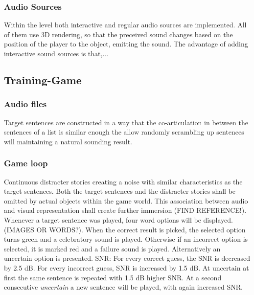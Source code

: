 \documentclass[a4paper,11pt]{article}%
\renewcommand{\\}{\vspace*{0.5\baselineskip} \newline}
\begin{document}
\subsubsection{Audio Sources}
Within the level both interactive and regular audio sources are implemented. All of them use 3D rendering, so that the preceived sound changes based on the position of the player to the object, emitting the sound. The advantage of adding interactive sound sources is that,...

\subsection{Training-Game}
\label{sec:training_game}


\subsubsection{Audio files}
Target sentences are constructed in a way that the co-articulation in between the sentences of a list is similar enough the allow randomly scrambling up sentences will maintaining a natural sounding result.

\subsubsection{Game loop}
Continuous distracter stories creating a noise with similar characteristics as the target sentences.
\newline
\newline
Both the target sentences and the distracter stories shall be omitted by actual objects within the game world. This association between audio and visual representation shall create further immersion (FIND REFERENCE!).
\newline
\newline
Whenever a target sentence was played, four word options will be displayed. (IMAGES OR WORDS?). When the correct result is picked, the selected option turns green and a celebratory sound is played. Otherwise if an incorrect option is selected, it is marked red and a failure sound is played. Alternatively an  \dq uncertain\dq{} option is presented.
\newline
\newline
SNR: For every correct guess, the SNR is decreased by 2.5 dB. For every incorrect guess, SNR is increased by 1.5 dB. At uncertain at first the same sentence is repeated with 1.5 dB higher SNR. At a second consecutive \textit{uncertain} a new sentence will be played, with again increased SNR.
\end{document}
